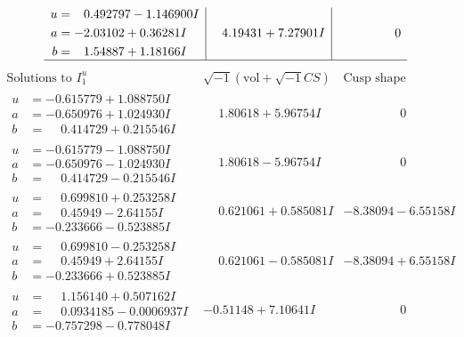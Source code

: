 \documentclass[1p]{elsarticle_modified}
\theoremstyle{definition}
\newcommand{\I}{\sqrt{-1}}
\begin{document}
$$\begin{array}{c|c|c}
\begin{aligned}
u &= \phantom{-}0.492797 - 1.146900 I \\
a &= -2.03102 + 0.36281 I \\
b &= \phantom{-}1.54887 + 1.18166 I\end{aligned}
 & \phantom{-}4.19431 + 7.27901 I & \phantom{-0.000000 } 0\\
 \hline 
 \end{array}$$\newpage$$\begin{array}{c|c|c}  
\text{Solutions to }I^u_{1}& \I (\text{vol} + \sqrt{-1}CS) & \text{Cusp shape}\\
 \hline 
\begin{aligned}
u &= -0.615779 + 1.088750 I \\
a &= -0.650976 + 1.024930 I \\
b &= \phantom{-}0.414729 + 0.215546 I\end{aligned}
 & \phantom{-}1.80618 + 5.96754 I & \phantom{-0.000000 } 0 \\ \hline\begin{aligned}
u &= -0.615779 - 1.088750 I \\
a &= -0.650976 - 1.024930 I \\
b &= \phantom{-}0.414729 - 0.215546 I\end{aligned}
 & \phantom{-}1.80618 - 5.96754 I & \phantom{-0.000000 } 0 \\ \hline\begin{aligned}
u &= \phantom{-}0.699810 + 0.253258 I \\
a &= \phantom{-}0.45949 - 2.64155 I \\
b &= -0.233666 - 0.523885 I\end{aligned}
 & \phantom{-}0.621061 + 0.585081 I & -8.38094 - 6.55158 I \\ \hline\begin{aligned}
u &= \phantom{-}0.699810 - 0.253258 I \\
a &= \phantom{-}0.45949 + 2.64155 I \\
b &= -0.233666 + 0.523885 I\end{aligned}
 & \phantom{-}0.621061 - 0.585081 I & -8.38094 + 6.55158 I \\ \hline\begin{aligned}
u &= \phantom{-}1.156140 + 0.507162 I \\
a &= \phantom{-}0.0934185 - 0.0006937 I \\
b &= -0.757298 - 0.778048 I\end{aligned}
 & -0.51148 + 7.10641 I & \phantom{-0.000000 } 0 \\ \hline\begin{aligned}

\end{aligned}
\end{array}$$
\end{document}
